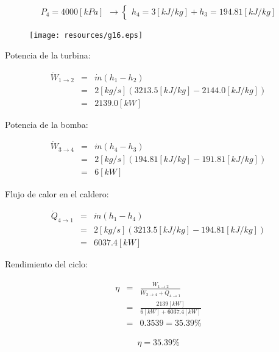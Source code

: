 \documentclass[letter,10pt]{article}
\begin{document}
\begin{enumerate}
\begin{eqnarray*}
    \begin{array}{c}
        P_4 = 4000[kPa]
    \end{array}
    \rightarrow
    \begin{cases}
        h_4 = 3[kJ/kg] + h_3 = 194.81[kJ/kg]
    \end{cases}
\end{eqnarray*}

\begin{figure}[H]
\centering
\texttt{[image: resources/g16.eps]}
\end{figure}

Potencia de la turbina:

\begin{eqnarray*}
    \dot{W}_{1\rightarrow2} &=& \dot{m}(h_1 - h_2) \\
                            &=& 2[kg/s](3213.5[kJ/kg]-2144.0[kJ/kg]) \\
                            &=& 2139.0[kW]
\end{eqnarray*}

Potencia de la bomba:

\begin{eqnarray*}
    \dot{W}_{3\rightarrow4} &=& \dot{m}(h_4 - h_3) \\
                            &=& 2[kg/s](194.81[kJ/kg]-191.81[kJ/kg]) \\
                            &=& 6[kW]
\end{eqnarray*}

Flujo de calor en el caldero:

\begin{eqnarray*}
    \dot{Q}_{4\rightarrow1} &=& \dot{m}(h_1 - h_4) \\
                            &=& 2[kg/s](3213.5[kJ/kg]-194.81[kJ/kg]) \\
                            &=& 6037.4[kW]
\end{eqnarray*}

Rendimiento del ciclo:

\begin{eqnarray*}
    \eta &=& \frac{\dot{W}_{1\rightarrow2}}
             {\dot{W}_{3\rightarrow4}+\dot{Q}_{4\rightarrow1}} \\
         &=& \frac{2139[kW]}{6[kW]+6037.4[kW]} \\
         &=& 0.3539 = 35.39\%
\end{eqnarray*}

\begin{equation*}
\boxed{
    \begin{array}{l}
        \eta = 35.39\%
    \end{array}
}
\end{equation*}


\end{enumerate}
\end{document}
